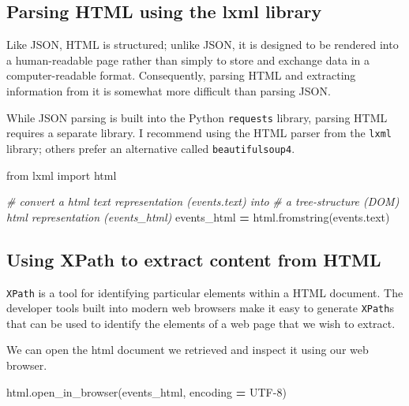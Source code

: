 \documentclass[
]{book}
\newenvironment{Shaded}{\begin{snugshade}}{\end{snugshade}}
\newcommand{\CommentTok}[1]{\textcolor[rgb]{0.56,0.35,0.01}{\textit{#1}}}
\newcommand{\ImportTok}[1]{#1}
\newcommand{\NormalTok}[1]{#1}
\newcommand{\OperatorTok}[1]{\textcolor[rgb]{0.81,0.36,0.00}{\textbf{#1}}}
\newcommand{\StringTok}[1]{\textcolor[rgb]{0.31,0.60,0.02}{#1}}
\begin{document}
\hypertarget{parsing-html-using-the-lxml-library}{%
\subsection{Parsing HTML using the lxml library}\label{parsing-html-using-the-lxml-library}}

Like JSON, HTML is structured; unlike JSON, it is designed to be rendered into a human-readable page rather than simply to store and exchange data in a computer-readable format. Consequently, parsing HTML and extracting information from it is somewhat more difficult than parsing JSON.

While JSON parsing is built into the Python \texttt{requests} library, parsing HTML requires a separate library. I recommend using the HTML parser from the \texttt{lxml} library; others prefer an alternative called \texttt{beautifulsoup4}.

\begin{Shaded}
\begin{Highlighting}[]
\ImportTok{from}\NormalTok{ lxml }\ImportTok{import}\NormalTok{ html}

\CommentTok{\# convert a html text representation (\textasciigrave{}events.text\textasciigrave{}) into }
\CommentTok{\# a tree{-}structure (DOM) html representation (\textasciigrave{}events\_html\textasciigrave{})}
\NormalTok{events\_html }\OperatorTok{=}\NormalTok{ html.fromstring(events.text)}
\end{Highlighting}
\end{Shaded}

\hypertarget{using-xpath-to-extract-content-from-html}{%
\subsection{Using XPath to extract content from HTML}\label{using-xpath-to-extract-content-from-html}}

\texttt{XPath} is a tool for identifying particular elements within a HTML document. The developer tools built into modern web browsers make it easy to generate \texttt{XPath}s that can be used to identify the elements of a web page that we wish to extract.

We can open the html document we retrieved and inspect it using our web browser.

\begin{Shaded}
\begin{Highlighting}[]
\NormalTok{html.open\_in\_browser(events\_html, encoding }\OperatorTok{=} \StringTok{\textquotesingle{}UTF{-}8\textquotesingle{}}\NormalTok{)}
\end{Highlighting}
\end{Shaded}
\end{document}
